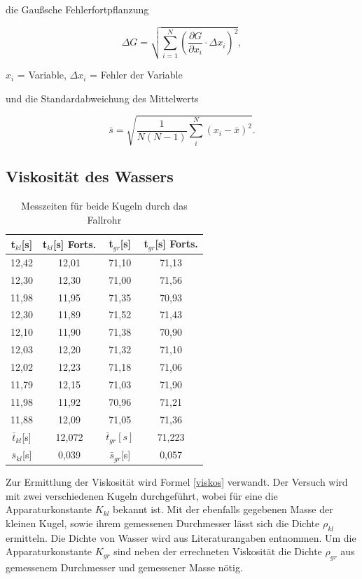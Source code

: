 die Gaußsche Fehlerfortpflanzung

\begin{formel}
\begin{equation}
\Delta G = \sqrt{\sum_{i=1}^{N}\left( \frac{\partial G}{\partial x_i}\cdot \Delta x_i\right)^2},
\label{gauss}
\end{equation}
\caption*{$x_i$ = Variable, $\Delta x_i$ = Fehler der Variable}
\end{formel}

und die Standardabweichung des Mittelwerts

\begin{equation}
 \bar s = \sqrt{\frac{1}{N(N-1)} \sum_{i}^{N} (x_i - \bar{x})^2}.
\end{equation}

\subsection{Viskosität des Wassers}

\renewcommand{\arraystretch}{1.2}
\begin{table}[h]
 \begin{tabular}{c|c||c|c}
 t$_{kl}$[s] & t$_{kl}$[s] Forts. & t$_{gr}$[s] & t$_{gr}$[s] Forts.\\
 \hline
12,42&	12,01&	71,10&	71,13\\
12,30&	12,30&	71,00&	71,56\\
11,98&	11,95&	71,35&	70,93\\
12,30&	11,89&	71,52&	71,43\\
12,10&	11,90&	71,38&	70,90\\
12,03&	12,20&	71,32&	71,10\\
12,02&	12,23&	71,18&	71,06\\
11,79&	12,15&	71,03&	71,90\\
11,98&	11,92&	70,96&	71,21\\
11,88&	12,09&	71,05&	71,36\\
\hline
$\bar t_{kl}$[s] &12,072 &$\bar t_{gr}[s] $&71,223\\
$\bar s_{kl}$[s] & 0,039 & $\bar s_{gr}$[s] & 0,057
 \end{tabular}
\caption{Messzeiten für beide Kugeln durch das Fallrohr}
\end{table}
\renewcommand{\arraystretch}{1}

Zur Ermittlung der Viskosität wird Formel \eqref{viskos} verwandt. Der Versuch wird mit zwei verschiedenen Kugeln durchgeführt, wobei
für eine die Apparaturkonstante $K_{kl}$ bekannt ist. Mit der ebenfalls gegebenen Masse der kleinen Kugel, sowie ihrem gemessenen Durchmesser
lässt sich die Dichte $\rho_{kl}$ ermitteln. Die Dichte von Wasser wird aus Literaturangaben entnommen. Um die Apparaturkonstante 
$K_{gr}$ sind neben der errechneten Viskosität die Dichte $\rho_{gr}$ aus gemessenem Durchmesser und gemessener Masse nötig.


